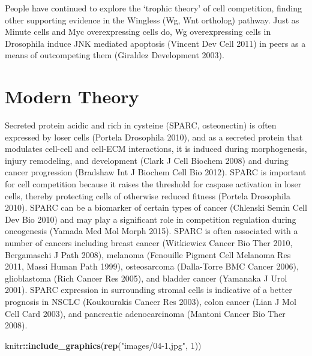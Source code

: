 \documentclass[]{book}
\newenvironment{Shaded}{\begin{snugshade}}{\end{snugshade}}
\newcommand{\DecValTok}[1]{\textcolor[rgb]{0.00,0.00,0.81}{#1}}
\newcommand{\KeywordTok}[1]{\textcolor[rgb]{0.13,0.29,0.53}{\textbf{#1}}}
\newcommand{\NormalTok}[1]{#1}
\newcommand{\OperatorTok}[1]{\textcolor[rgb]{0.81,0.36,0.00}{\textbf{#1}}}
\newcommand{\StringTok}[1]{\textcolor[rgb]{0.31,0.60,0.02}{#1}}
\begin{document}
People have continued to explore the `trophic theory' of cell competition, finding other supporting evidence in the Wingless (Wg, Wnt ortholog) pathway. Just as Minute cells and Myc overexpressing cells do, Wg overexpressing cells in Drosophila induce JNK mediated apoptosis (Vincent Dev Cell 2011) in peers as a means of outcompeting them (Giraldez Development 2003).

\hypertarget{modern-theory}{%
\section{Modern Theory}\label{modern-theory}}

Secreted protein acidic and rich in cysteine (SPARC, osteonectin) is often expressed by loser cells (Portela Drosophila 2010), and as a secreted protein that modulates cell-cell and cell-ECM interactions, it is induced during morphogenesis, injury remodeling, and development (Clark J Cell Biochem 2008) and during cancer progression (Bradshaw Int J Biochem Cell Bio 2012). SPARC is important for cell competition because it raises the threshold for caspase activation in loser cells, thereby protecting cells of otherwise reduced fitness (Portela Drosophila 2010). SPARC can be a biomarker of certain types of cancer (Chlenski Semin Cell Dev Bio 2010) and may play a significant role in competition regulation during oncogenesis (Yamada Med Mol Morph 2015). SPARC is often associated with a number of cancers including breast cancer (Witkiewicz Cancer Bio Ther 2010, Bergamaschi J Path 2008), melanoma (Fenouille Pigment Cell Melanoma Res 2011, Massi Human Path 1999), osteosarcoma (Dalla-Torre BMC Cancer 2006), glioblastoma (Rich Cancer Res 2005), and bladder cancer (Yamanaka J Urol 2001). SPARC expression in surrounding stromal cells is indicative of a better prognosis in NSCLC (Koukourakis Cancer Res 2003), colon cancer (Lian J Mol Cell Card 2003), and pancreatic adenocarcinoma (Mantoni Cancer Bio Ther 2008).

\begin{Shaded}
\begin{Highlighting}[]
\NormalTok{knitr}\OperatorTok{::}\KeywordTok{include_graphics}\NormalTok{(}\KeywordTok{rep}\NormalTok{(}\StringTok{"images/04-1.jpg"}\NormalTok{, }\DecValTok{1}\NormalTok{))}
\end{Highlighting}
\end{Shaded}
\end{document}
